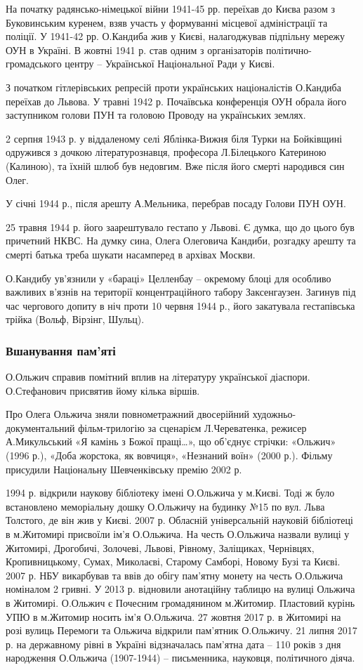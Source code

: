 На початку радянсько-німецької війни 1941-45 рр. переїхав до Києва разом з
Буковинським куренем, взяв участь у формуванні місцевої адміністрації та
поліції. У 1941-42 рр. О.Кандиба жив у Києві, налагоджував підпільну мережу ОУН
в Україні. В жовтні 1941 р. став одним з організаторів політично-громадського
центру – Української Національної Ради у Києві.

З початком гітлерівських репресій проти українських націоналістів О.Кандиба
переїхав до Львова. У травні 1942 р. Почаївська конференція ОУН обрала його
заступником голови ПУН та головою Проводу на українських землях.

2 серпня 1943 р. у віддаленому селі Яблінка-Вижня біля Турки на Бойківщині
одружився з дочкою літературознавця, професора Л.Білецького Катериною
(Калиною), та їхній шлюб був недовгим. Вже після його смерті народився син
Олег.

У січні 1944 р., після арешту А.Мельника, перебрав посаду Голови ПУН ОУН.

25 травня 1944 р. його заарештувало гестапо у Львові. Є думка, що до цього був
причетний НКВС. На думку сина, Олега Олеговича Кандиби, розгадку арешту та
смерті батька треба шукати насамперед в архівах Москви. 

О.Кандибу ув'язнили у «бараці» Целленбау – окремому блоці для особливо важливих
в'язнів на території концентраційного табору Заксенгаузен. Загинув під час
чергового допиту в ніч проти 10 червня 1944 р., його закатувала гестапівська
трійка (Вольф, Вірзінг, Шульц).

\subsubsection{Вшанування пам'яті}

О.Ольжич справив помітний вплив на літературу української діаспори. О.Стефанович присвятив йому кілька віршів.

Про Олега Ольжича зняли повнометражний двосерійний художньо-документальний
фільм-трилогію за сценарієм Л.Череватенка, режисер А.Микульський «Я камінь з
Божої пращі…», що об'єднує стрічки: «Ольжич» (1996 р.), «Доба жорстока, як
вовчиця», «Незнаний воїн» (2000 р.). Фільму присудили Національну Шевченківську
премію 2002 р.

1994 р. відкрили наукову бібліотеку імені О.Ольжича у м.Києві. 
Тоді ж було встановлено меморіальну дошку О.Ольжичу на будинку №15 по вул. Льва Толстого, де він жив у Києві. 
2007 р. Обласній універсальній науковій бібліотеці в м.Житомирі присвоїли ім'я О.Ольжича. 
На честь О.Ольжича назвали вулиці у Житомирі, Дрогобичі, Золочеві, Львові, Рівному, Заліщиках, Чернівцях, Кропивницькому, Сумах, Миколаєві, Старому Самборі, Новому Бузі та Києві. 
2007 р. НБУ викарбував та ввів до обігу пам'ятну монету на честь О.Ольжича номіналом 2 гривні. 
У 2013 р. відновили анотаційну таблицю на вулиці Ольжича в Житомирі. 
О.Ольжич є Почесним громадянином м.Житомир. 
Пластовий курінь УПЮ в м.Житомир носить ім'я О.Ольжича. 
27 жовтня 2017 р. в Житомирі на розі вулиць Перемоги та Ольжича відкрили пам'ятник О.Ольжичу. 
21 липня 2017 р. на державному рівні в Україні відзначалась пам'ятна дата – 110 років з дня народження О.Ольжича (1907-1944) – письменника, науковця, політичного діяча. 

